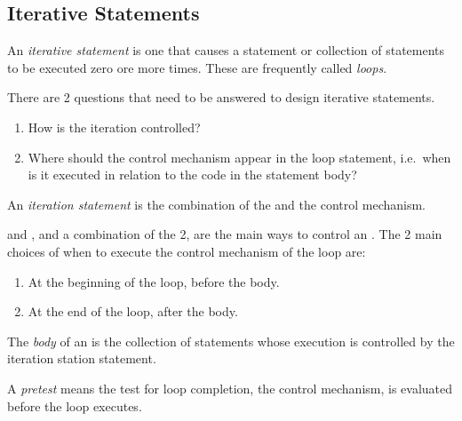 \subsection{Iterative Statements}\label{subsec:Iterative_Statements}
\begin{definition}\label{def:Iterative_Statement}
  An \emph{iterative statement} is one that causes a statement or collection of statements to be executed zero ore more times.
  These are frequently called \emph{loops}.

  There are 2 questions that need to be answered to design iterative statements.
  \begin{enumerate}[noitemsep]
  \item How is the iteration controlled?
  \item Where should the control mechanism appear in the loop statement, i.e.\ when is it executed in relation to the code in the statement body?
  \end{enumerate}

  \begin{remark}\label{rmk:Iteration_Statement}
    An \emph{iteration statement} is the combination of the  and the control mechanism.
  \end{remark}
\end{definition}

 and , and a combination of the 2, are the main ways to control an .
The 2 main choices of when to execute the control mechanism of the loop are:
\begin{enumerate}[noitemsep]
\item At the beginning of the loop, before the body. 
\item At the end of the loop, after the body. 
\end{enumerate}

\begin{definition}[Body]\label{def:Iterative_Statement-Body}
  The \emph{body} of an  is the collection of statements whose execution is controlled by the iteration station statement.
\end{definition}

\begin{definition}[Pretest]\label{def:Iterative_Statement-Pretest_Control}
  A \emph{pretest}  means the test for loop completion, the control mechanism, is evaluated before the loop  executes.
\end{definition}

